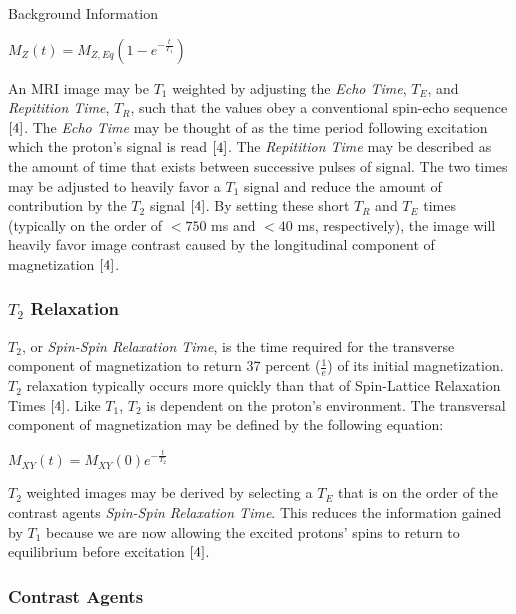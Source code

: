 \documentclass[a4paper,12pt]{article}
\begin{document}
\begin{section}{Background Information}
\begin{center}
$M_Z(t) = M_{Z,Eq}(1 - e^{-\frac{t}{T_1}})$ 
\end{center}

An MRI image may be $T_1$ weighted by adjusting the {\em Echo Time}, $T_E$, and {\em Repitition Time}, $T_R$, such that the values obey a conventional spin-echo sequence $\cite{4}$. The {\em Echo Time} may be thought of as the time period following excitation which the proton's signal is read $\cite{4}$. The {\em Repitition Time} may be described as the amount of time that exists between successive pulses of signal. The two times may be adjusted to heavily favor a $T_1$ signal and reduce the amount of contribution by the $T_2$ signal $\cite{4}$. By setting these short $T_R$ and $T_E$ times (typically on the order of $< 750$ ms and $< 40$ ms, respectively), the image will heavily favor image contrast caused by the longitudinal component of magnetization $\cite{4}$.

\subsubsection{$T_2$ Relaxation}
$T_2$, or {\em Spin-Spin Relaxation Time}, is the time required for the transverse component of magnetization to return 37 percent ($\frac{1}{e}$) of its initial magnetization. $T_2$ relaxation typically occurs more quickly than that of Spin-Lattice Relaxation Times $\cite{4}$. Like $T_1$, $T_2$ is dependent on the proton's environment. The transversal component of magnetization may be defined by the following equation:

\begin{center}
$M_{XY}(t) = M_{XY}(0)e^{-\frac{t}{T_2}}$ 
\end{center}


$T_2$ weighted images may be derived by selecting a $T_E$ that is on the order of the contrast agents {\em Spin-Spin Relaxation Time}. This reduces the information gained by $T_1$ because we are now allowing the excited protons' spins to return to equilibrium before excitation $\cite{4}$.

\subsubsection{Contrast Agents}


\end{section}
\end{document}
